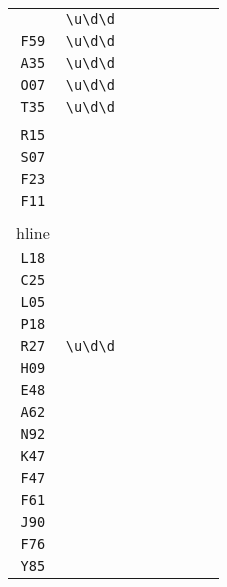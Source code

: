 \begin{longtable}{cccccccc}
\begin{tabular}{ll}
    \verb|G16| & \verb|\u\d\d|\\
\verb|F59| & \verb|\u\d\d|\\
\verb|A35| & \verb|\u\d\d|\\
\verb|O07| & \verb|\u\d\d|\\
\verb|T35| & \verb|\u\d\d|
\end{tabular}
\\\midrule 
\begin{tabular}{l}
    \verb|C32|\\
\verb|R15|\\
\verb|S07|\\
\verb|F23|\\
\verb|F11|\\
\\hline\\
\verb|L18|\\
\verb|C25|\\
\verb|L05|\\
\verb|P18|\\
\verb|R27|
\end{tabular}

&
\verb|\u\d\d|
&

\begin{tabular}{l}
    \verb|\u\d\d|\\
\verb|H09|\\
\verb|E48|\\
\verb|A62|\\
\verb|N92|\\
\verb|K47|
\end{tabular}

&

\begin{tabular}{l}
    \verb.(F)|(\u)\d\d.\\
\verb|F47|\\
\verb|F61|\\
\verb|J90|\\
\verb|F76|\\
\verb|Y85|
\end{tabular}

&


\end{longtable}
